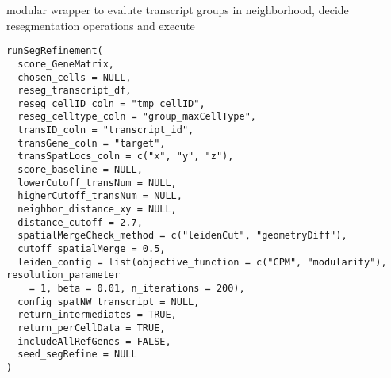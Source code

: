 \documentclass[letterpaper]{book}
\begin{document}
%
\begin{Description}
modular wrapper to evalute transcript groups in neighborhood, decide resegmentation operations and execute
\end{Description}
%
\begin{Usage}
\begin{verbatim}
runSegRefinement(
  score_GeneMatrix,
  chosen_cells = NULL,
  reseg_transcript_df,
  reseg_cellID_coln = "tmp_cellID",
  reseg_celltype_coln = "group_maxCellType",
  transID_coln = "transcript_id",
  transGene_coln = "target",
  transSpatLocs_coln = c("x", "y", "z"),
  score_baseline = NULL,
  lowerCutoff_transNum = NULL,
  higherCutoff_transNum = NULL,
  neighbor_distance_xy = NULL,
  distance_cutoff = 2.7,
  spatialMergeCheck_method = c("leidenCut", "geometryDiff"),
  cutoff_spatialMerge = 0.5,
  leiden_config = list(objective_function = c("CPM", "modularity"), resolution_parameter
    = 1, beta = 0.01, n_iterations = 200),
  config_spatNW_transcript = NULL,
  return_intermediates = TRUE,
  return_perCellData = TRUE,
  includeAllRefGenes = FALSE,
  seed_segRefine = NULL
)
\end{verbatim}
\end{Usage}
%
\end{document}

